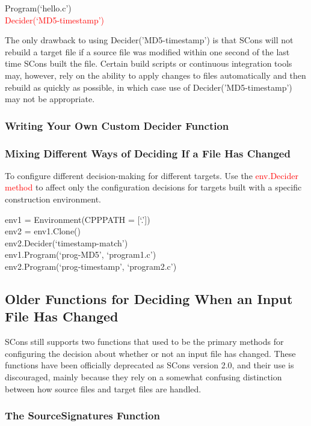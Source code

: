 \documentclass[12pt,a4paper]{article}
\begin{document}
Program(`hello.c') \\
\textcolor{red}{Decider(`MD5-timestamp')}


The only drawback to using Decider('MD5-timestamp') is that SCons will not rebuild a target file if a source file was modified within one second of the last time SCons built the file. Certain build scripts or continuous integration tools may, however, rely on the ability to apply changes to files automatically and then rebuild as quickly as possible, in which case use of Decider('MD5-timestamp') may not be appropriate.

\subsubsection{Writing Your Own Custom Decider Function}

\subsubsection{Mixing Different Ways of Deciding If a File Has Changed}
To configure different decision-making for different targets. Use the \textcolor{red}{env.Decider method} to affect only the configuration decisions for targets built with a specific construction environment.

env1 = Environment(CPPPATH = [`.']) \\
env2 = env1.Clone() \\
env2.Decider(`timestamp-match') \\
env1.Program(`prog-MD5', `program1.c') \\
env2.Program(`prog-timestamp', `program2.c')

\subsection{Older Functions for Deciding When an Input File Has Changed}
SCons still supports two functions that used to be the primary methods for configuring the decision about whether or not an input file has changed. These functions have been officially deprecated as SCons version 2.0, and their use is discouraged, mainly because they rely on a somewhat confusing distinction between how source files and target files are handled. 

\subsubsection{The SourceSignatures Function}
\end{document}
